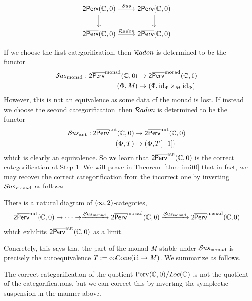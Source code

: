 \[\begin{tikzcd}[ampersand replacement=\&]
	{\sftwoP(\bbC,0)} \& {\sftwoP(\bbC,0)} \\
	{\olsftwoP(\bbC,0)} \& {\olsftwoP(\bbC,0)}
	\arrow["\calSus", from=1-1, to=1-2]
	\arrow[from=1-1, to=2-1]
	\arrow[from=1-2, to=2-2]
	\arrow["{\calRadon}", from=2-1, to=2-2]
\end{tikzcd}\]

If we choose the first categorification, then $\mathcal{R}\kern -.5pt adon$ is determined to be the functor
\begin{align*}
    \mathcal{S}\kern -.5pt us_{\operatorname{monad}}:\mathsf{2}\overline{\mathsf{Perv}}^{\operatorname{monad}}(\mathbb{C},0)&\to \mathsf{2}\overline{\mathsf{Perv}}^{\operatorname{monad}}(\mathbb{C},0)\\
    (\Phi,M)&\mapsto (\Phi,\operatorname{id}_\Phi\times_M\operatorname{id}_\Phi)
\end{align*}
However, this is not an equivalence as some data of the monad is lost. If instead we choose the second categorification, then $\mathcal{R}\kern -.5pt adon$ is determined to be the functor
\begin{align*}
    \mathcal{S}\kern -.5pt us_{\operatorname{aut}}:\mathsf{2}\overline{\mathsf{Perv}}^{\operatorname{aut}}(\mathbb{C},0)&\to \mathsf{2}\overline{\mathsf{Perv}}^{\operatorname{aut}}(\mathbb{C},0)\\
    (\Phi,T)&\mapsto (\Phi,T[-1])
\end{align*}
which is clearly an equivalence. So we learn that $\mathsf{2}\overline{\mathsf{Perv}}^{\operatorname{aut}}(\mathbb{C},0)$ is the correct categorification at Step 1. We will prove in Theorem~\ref{thm:limit0} that in fact, we may recover the correct categorification from the incorrect one by inverting $\mathcal{S}\kern -.5pt us_{\operatorname{monad}}$ as follows.

\begin{thm}\label{thm:introcolimit}
    There is a natural diagram of $(\infty,2)$-categories,
    \[\mathsf{2}\overline{\mathsf{Perv}}^{\operatorname{aut}}(\mathbb{C},0)\to \cdots\to \xrightarrow{\mathcal{S}\kern -.5pt us_{\operatorname{monad}}}\mathsf{2}\overline{\mathsf{Perv}}^{\operatorname{monad}}(\mathbb{C},0)\xrightarrow{\mathcal{S}\kern -.5pt us_{\operatorname{monad}}}\mathsf{2}\overline{\mathsf{Perv}}^{\operatorname{monad}}(\mathbb{C},0)\]
    which exhibits $\mathsf{2}\overline{\mathsf{Perv}}^{\operatorname{aut}}(\mathbb{C},0)$ as a limit.
\end{thm}

Concretely, this says that the part of the monad $M$ stable under $\mathcal{S}\kern -.5pt us_{\operatorname{monad}}$ is precisely the autoequivalence $T:=\operatorname{coCone}(\operatorname{id}\to M)$. We summarize as follows.

\begin{moral}\label{moral:intromain}
    The correct categorification of the quotient ${\operatorname{Perv}}(\mathbb{C},0)/Loc(\mathbb{C})$ is not the quotient of the categorifications, but we can correct this by inverting the symplectic suspension in the manner above.
\end{moral}

